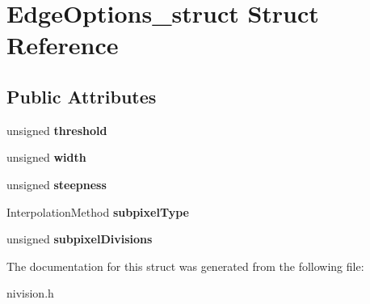 \hypertarget{structEdgeOptions__struct}{
\section{EdgeOptions\_\-struct Struct Reference}
\label{structEdgeOptions__struct}
}
\subsection*{Public Attributes}
\begin{DoxyCompactItemize}
\item 
\hypertarget{structEdgeOptions__struct_a6e92d0a0f29a65abb5461beaea1ff43d}{
unsigned {\bfseries threshold}}
\label{structEdgeOptions__struct_a6e92d0a0f29a65abb5461beaea1ff43d}

\item 
\hypertarget{structEdgeOptions__struct_aeab264285ad677497b2188c29692765b}{
unsigned {\bfseries width}}
\label{structEdgeOptions__struct_aeab264285ad677497b2188c29692765b}

\item 
\hypertarget{structEdgeOptions__struct_aec9f003b66b0678cd2497922d955053f}{
unsigned {\bfseries steepness}}
\label{structEdgeOptions__struct_aec9f003b66b0678cd2497922d955053f}

\item 
\hypertarget{structEdgeOptions__struct_a2197d3454703243ae3051334ac2c1045}{
InterpolationMethod {\bfseries subpixelType}}
\label{structEdgeOptions__struct_a2197d3454703243ae3051334ac2c1045}

\item 
\hypertarget{structEdgeOptions__struct_a5eae9518a3812627939d136c9345f80e}{
unsigned {\bfseries subpixelDivisions}}
\label{structEdgeOptions__struct_a5eae9518a3812627939d136c9345f80e}

\end{DoxyCompactItemize}


The documentation for this struct was generated from the following file:\begin{DoxyCompactItemize}
\item 
nivision.h\end{DoxyCompactItemize}

